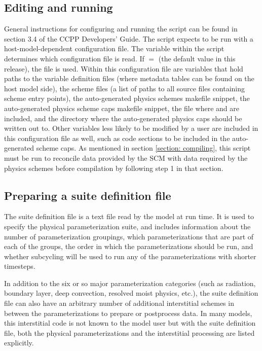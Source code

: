 \subsection{Editing and running }

General instructions for configuring and running the  script can be found in section 3.4 of the CCPP Developers' Guide. The script expects to be run with a host-model-dependent configuration file. The  variable within the script determines which configuration file is read. If  $=$  (the default value in this release), the file  is used. Within this configuration file are variables that hold paths to the variable definition files (where metadata tables can be found on the host model side), the scheme files (a list of paths to all source files containing scheme entry points), the auto-generated physics schemes makefile snippet, the auto-generated physics scheme caps makefile snippet, the file where  and  are included, and the directory where the auto-generated physics caps should be written out to. Other variables less likely to be modified by a user are included in this configuration file as well, such as code sections to be included in the auto-generated scheme caps. As mentioned in section \ref{section: compiling}, this script must be run to reconcile data provided by the SCM with data required by the physics schemes before compilation by following step 1 in that section.

\subsection{Preparing a suite definition file}
The suite definition file is a text file read by the model at run time. It is used to specify the physical parameterization suite, and includes information about the number of parameterization groupings, which parameterizations that are part of each of the groups, the order in which the parameterizations should be run, and whether subcycling will be used to run any of the parameterizations with shorter timesteps.

In addition to the six or so major parameterization categories (such as radiation, boundary layer, deep convection, resolved moist physics, etc.), the suite definition file can also have an arbitrary number of additional interstitial schemes in between the parameterizations to prepare or postprocess data. In many models, this interstitial code is not known to the model user but with the suite definition file, both the physical parameterizations and the interstitial processing are listed explicitly.

